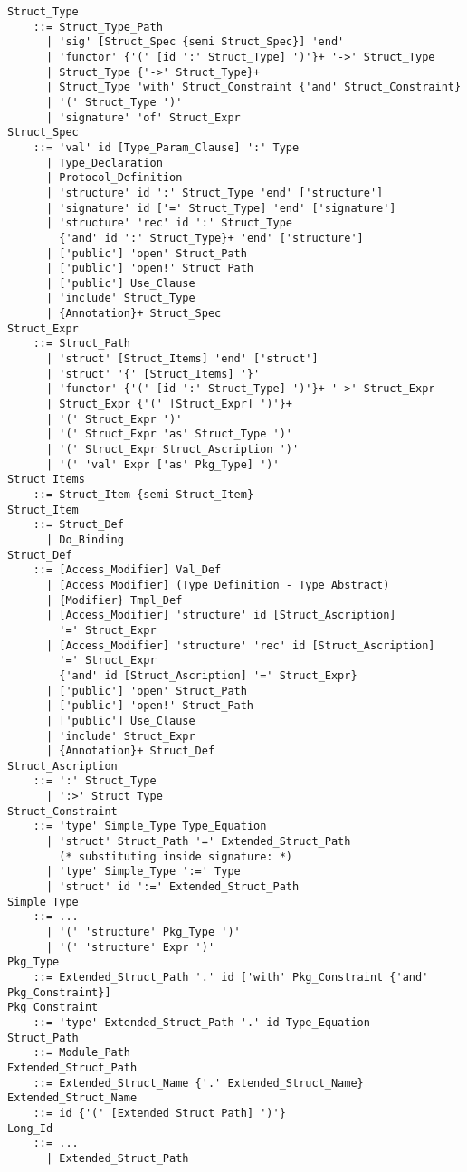 \grammar\begin{lstlisting}
Struct_Type 
    ::= Struct_Type_Path
      | 'sig' [Struct_Spec {semi Struct_Spec}] 'end'
      | 'functor' {'(' [id ':' Struct_Type] ')'}+ '->' Struct_Type
      | Struct_Type {'->' Struct_Type}+
      | Struct_Type 'with' Struct_Constraint {'and' Struct_Constraint}
      | '(' Struct_Type ')'
      | 'signature' 'of' Struct_Expr
Struct_Spec 
    ::= 'val' id [Type_Param_Clause] ':' Type
      | Type_Declaration
      | Protocol_Definition
      | 'structure' id ':' Struct_Type 'end' ['structure']
      | 'signature' id ['=' Struct_Type] 'end' ['signature']
      | 'structure' 'rec' id ':' Struct_Type 
        {'and' id ':' Struct_Type}+ 'end' ['structure']
      | ['public'] 'open' Struct_Path
      | ['public'] 'open!' Struct_Path
      | ['public'] Use_Clause
      | 'include' Struct_Type
      | {Annotation}+ Struct_Spec
Struct_Expr 
    ::= Struct_Path
      | 'struct' [Struct_Items] 'end' ['struct']
      | 'struct' '{' [Struct_Items] '}'
      | 'functor' {'(' [id ':' Struct_Type] ')'}+ '->' Struct_Expr
      | Struct_Expr {'(' [Struct_Expr] ')'}+
      | '(' Struct_Expr ')'
      | '(' Struct_Expr 'as' Struct_Type ')'
      | '(' Struct_Expr Struct_Ascription ')'
      | '(' 'val' Expr ['as' Pkg_Type] ')'
Struct_Items 
    ::= Struct_Item {semi Struct_Item} 
Struct_Item 
    ::= Struct_Def 
      | Do_Binding
Struct_Def 
    ::= [Access_Modifier] Val_Def
      | [Access_Modifier] (Type_Definition - Type_Abstract)
      | {Modifier} Tmpl_Def
      | [Access_Modifier] 'structure' id [Struct_Ascription] 
        '=' Struct_Expr
      | [Access_Modifier] 'structure' 'rec' id [Struct_Ascription] 
        '=' Struct_Expr 
        {'and' id [Struct_Ascription] '=' Struct_Expr}
      | ['public'] 'open' Struct_Path
      | ['public'] 'open!' Struct_Path
      | ['public'] Use_Clause
      | 'include' Struct_Expr
      | {Annotation}+ Struct_Def
Struct_Ascription 
    ::= ':' Struct_Type
      | ':>' Struct_Type
Struct_Constraint 
    ::= 'type' Simple_Type Type_Equation
      | 'struct' Struct_Path '=' Extended_Struct_Path
        (* substituting inside signature: *)
      | 'type' Simple_Type ':=' Type
      | 'struct' id ':=' Extended_Struct_Path
Simple_Type 
    ::= ...
      | '(' 'structure' Pkg_Type ')'
      | '(' 'structure' Expr ')'
Pkg_Type 
    ::= Extended_Struct_Path '.' id ['with' Pkg_Constraint {'and' Pkg_Constraint}]
Pkg_Constraint
    ::= 'type' Extended_Struct_Path '.' id Type_Equation 
Struct_Path
    ::= Module_Path
Extended_Struct_Path 
    ::= Extended_Struct_Name {'.' Extended_Struct_Name}
Extended_Struct_Name 
    ::= id {'(' [Extended_Struct_Path] ')'}
Long_Id
    ::= ...
      | Extended_Struct_Path
\end{lstlisting}






